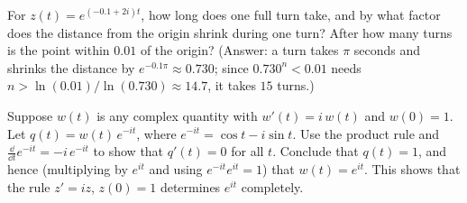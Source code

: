 \begin{exercise}
For $z(t) = e^{(-0.1 + 2i)t}$, how long does one full turn take, and by what factor does the distance from the origin shrink during one turn? After how many turns is the point within $0.01$ of the origin? (Answer: a turn takes $\pi$ seconds and shrinks the distance by $e^{-0.1\pi} \approx 0.730$; since $0.730^{n} < 0.01$ needs $n > \ln(0.01)/\ln(0.730) \approx 14.7$, it takes $15$ turns.)
\end{exercise}

\begin{exercise}
\label{ch30:exr-unique}
Suppose $w(t)$ is any complex quantity with $w'(t) = i\,w(t)$ and $w(0) = 1$. Let $q(t) = w(t)\,e^{-it}$, where $e^{-it} = \cos t - i\sin t$. Use the product rule and $\frac{\dd}{\dd t}e^{-it} = -i\,e^{-it}$ to show that $q'(t) = 0$ for all $t$. Conclude that $q(t) = 1$, and hence (multiplying by $e^{it}$ and using $e^{-it}e^{it} = 1$) that $w(t) = e^{it}$. This shows that the rule $z' = iz$, $z(0) = 1$ determines $e^{it}$ completely.
\end{exercise}
